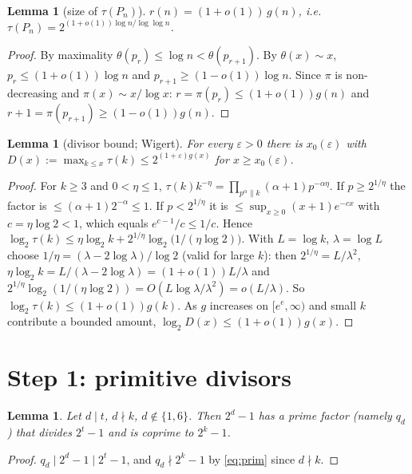 \documentclass[11pt]{article}
\newtheorem{lemma}[theorem]{Lemma}
\theoremstyle{remark}
\begin{document}
\begin{lemma}[size of $\tau(P_n)$]\label{lem:primorial}
$r(n)=(1+o(1))\,g(n)$, i.e.\ $\tau(P_n)=2^{(1+o(1))\log n/\log\log n}$.
\end{lemma}
\begin{proof}
By maximality $\theta(p_r)\le\log n<\theta(p_{r+1})$. By $\theta(x)\sim x$,
$p_r\le(1+o(1))\log n$ and $p_{r+1}\ge(1-o(1))\log n$. Since $\pi$ is non-decreasing and
$\pi(x)\sim x/\log x$: $r=\pi(p_r)\le(1+o(1))g(n)$ and
$r+1=\pi(p_{r+1})\ge(1-o(1))g(n)$.
\end{proof}

\begin{lemma}[divisor bound; Wigert]\label{lem:wigert}
For every $\varepsilon>0$ there is $x_0(\varepsilon)$ with
$D(x):=\max_{k\le x}\tau(k)\le 2^{(1+\varepsilon)g(x)}$ for $x\ge x_0(\varepsilon)$.
\end{lemma}
\begin{proof}
For $k\ge3$ and $0<\eta\le1$, $\tau(k)k^{-\eta}=\prod_{p^\alpha\parallel k}(\alpha+1)p^{-\alpha\eta}$.
If $p\ge2^{1/\eta}$ the factor is $\le(\alpha+1)2^{-\alpha}\le1$. If $p<2^{1/\eta}$ it is
$\le\sup_{x\ge0}(x+1)e^{-cx}$ with $c=\eta\log2<1$, which equals $e^{c-1}/c\le1/c$. Hence
$\log_2\tau(k)\le\eta\log_2k+2^{1/\eta}\log_2\!\big(1/(\eta\log2)\big)$. With $L=\log k$, $\lambda=\log L$
choose $1/\eta=(\lambda-2\log\lambda)/\log2$ (valid for large $k$): then $2^{1/\eta}=L/\lambda^2$,
$\eta\log_2k=L/(\lambda-2\log\lambda)=(1+o(1))L/\lambda$ and
$2^{1/\eta}\log_2(1/(\eta\log2))=O(L\log\lambda/\lambda^2)=o(L/\lambda)$. So
$\log_2\tau(k)\le(1+o(1))g(k)$. As $g$ increases on $[e^e,\infty)$ and small $k$ contribute a
bounded amount, $\log_2D(x)\le(1+o(1))g(x)$.
\end{proof}

\section{Step 1: primitive divisors}

\begin{lemma}\label{lem:step1}
Let $d\mid t$, $d\nmid k$, $d\notin\{1,6\}$. Then $2^d-1$ has a prime factor (namely $q_d$) that
divides $2^t-1$ and is coprime to $2^k-1$.
\end{lemma}
\begin{proof}
$q_d\mid2^d-1\mid2^t-1$, and $q_d\nmid2^k-1$ by \eqref{eq:prim} since $d\nmid k$.
\end{proof}
\end{document}

